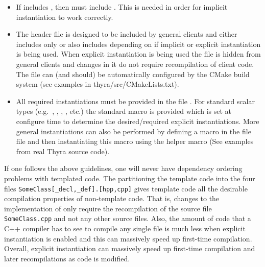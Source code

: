 \begin{itemize}
\begin{itemize}
{}\item If {} includes
{}, then {} must
include {}.  This is needed in order for
implicit instantiation to work correctly.

{}\item The header file {} is designed to be
included by general clients and either includes only
{} or also includes
{} depending on if implicit or explicit
instantiation is being used.  When explicit instantiation is being
used the file {} is hidden from general
clients and changes in it do not require recompilation of client code.
The file {} can (and should) be automatically
configured by the CMake build system (see examples in
thyra/src/CMakeLists.txt).

{}\item All required instantiations must be provided in the file
{}.  For standard scalar types (e.g.\ {},
{}, {}, {},
etc.) the standard macro
{} is provided
which is set at configure time to determine the desired/required explicit
instantiations.  More general instantiations can also be performed by defining
a macro in the file {} file and then instantiating
this macro using the helper macro
{} (See examples
from real Thyra source code).

\end{itemize}

If one follows the above guidelines, one will never have dependency
ordering problems with templated code.  The partitioning the template
code into the four files {}\texttt{SomeClass[\_decl,\_def].[hpp,cpp]}
gives template code all the desirable compilation properties of
non-template code.  That is, changes to the implementation of
{} only require the recompilation of the source file
{}\texttt{SomeClass.cpp} and not any other source files.  Also, the
amount of code that a C++ compiler has to see to compile any single
{} file is much less when explicit instantiation is enabled
and this can massively speed up first-time compilation.  Overall,
explicit instantiation can massively speed up first-time compilation
and later recompilations as code is modified.


\end{itemize}


